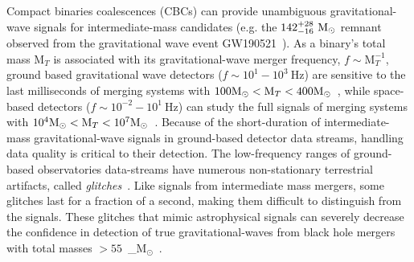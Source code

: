 \documentclass[%
 nofootinbib,
 amsmath,amssymb,
 aps,
 twocolumn,
 superscriptaddress
]{revtex4-2}
\newcommand{\mathcmd}[1]{{\sc \relax\ifmmode#1\else $#1$\fi}\xspace}
\newcommand{\msun}{\mathcmd{\text{M}_\odot}}
\begin{document}
Compact binaries coalescences (CBCs) can provide unambiguous gravitational-wave signals for intermediate-mass candidates (e.g. the $142^{+28}_{-16}\ \msun$ remnant observed from the gravitational wave event GW190521~\cite{Abbott:2020:PhRvL}). As a binary's total mass $\text{M}_{T}$ is associated with its gravitational-wave merger frequency, $f\sim \text{M}_{T}^{-1}$,  ground based gravitational wave detectors ($f\sim 10^1 - 10^3\ \text{Hz}$) are sensitive to the last milliseconds of merging systems with $100 \msun < \text{M}_{T} < 400 \msun$~\cite{LIGOScientificCollaboration:2015:CQGra, Martynov:2016:PhRvD, Moore_2014}, while space-based detectors ($f \sim 10^{-2} - 10^1\ \text{Hz}$) can study the full signals of merging systems with $10^4 \msun < \text{M}_{T} < 10^7 \msun$~\cite{ Moore_2014, Lu:2019:PhRvD}. Because of the short-duration of intermediate-mass gravitational-wave signals in ground-based detector data streams, handling data quality is critical to their detection. The low-frequency ranges of ground-based observatories data-streams have numerous non-stationary terrestrial artifacts, called \textit{glitches}~\cite{ pycbc_short_duration_transients, pe_with_glitch, blip_glitches}. Like signals from intermediate mass mergers, some glitches last for a fraction of a second, making them difficult to distinguish from the signals. These glitches that mimic astrophysical signals can severely decrease the confidence in detection of true gravitational-waves from black hole mergers with total masses $>55$~\msun ~\cite{pycbc_short_duration_transients}.
\end{document}
